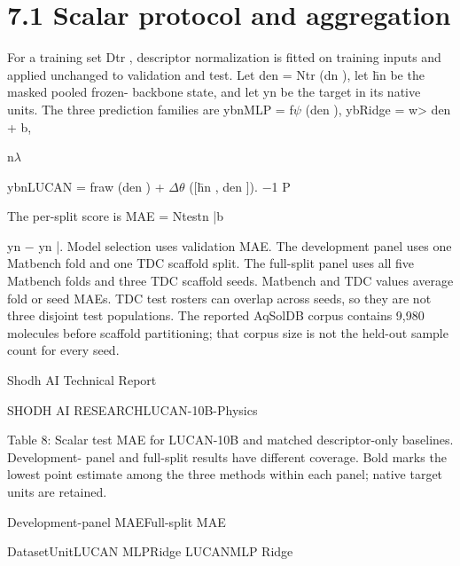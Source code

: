 \documentclass[11pt]{article}
\begin{document}
\section*{7.1 Scalar protocol and aggregation}

For a training set Dtr , descriptor normalization is fitted on training inputs and applied
unchanged to validation and test. Let den = Ntr (dn ), let h̄n be the masked pooled frozen-
backbone state, and let yn be the target in its native units. The three prediction families
are
ybnMLP = f\ensuremath{\psi} (den ),
ybRidge = w> den + b,

\noindent n\quad \ensuremath{\lambda}\par


ybnLUCAN = fraw (den ) + \ensuremath{\Delta}\ensuremath{\theta} ([h̄n , den ]).
\ensuremath{-}1 P

\noindent The per-split score is MAE = Ntest\quad n |b\par

yn \ensuremath{-} yn |. Model selection uses validation MAE.
The development panel uses one Matbench fold and one TDC scaffold split. The full-split
panel uses all five Matbench folds and three TDC scaffold seeds. Matbench and TDC
values average fold or seed MAEs. TDC test rosters can overlap across seeds, so they are
not three disjoint test populations. The reported AqSolDB corpus contains 9,980 molecules
before scaffold partitioning; that corpus size is not the held-out sample count for every seed.





\noindent Shodh AI Technical Report\par




\noindent SHODH AI RESEARCH\quad LUCAN-10B-Physics\par



Table 8: Scalar test MAE for LUCAN-10B and matched descriptor-only baselines. Development-
panel and full-split results have different coverage. Bold marks the lowest point estimate among
the three methods within each panel; native target units are retained.


\noindent Development-panel MAE\quad Full-split MAE\par


\noindent Dataset\quad Unit\quad LUCAN MLP\quad Ridge LUCAN\quad MLP Ridge\par
\end{document}
